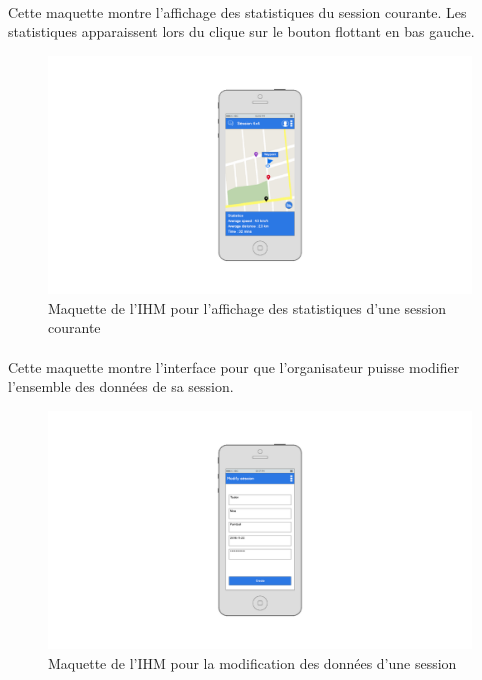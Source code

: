 \documentclass[titlepage, 12pt]{report}
\begin{document}
\clearpage

\paragraph{}Cette maquette montre l'affichage des statistiques du session courante. Les statistiques apparaissent lors du clique sur le bouton flottant en bas gauche.

\begin{figure}[!h]
	\caption{Maquette de l'IHM pour l'affichage des statistiques d'une session courante}
	\label{statistics_view}
	\centering
	\includegraphics[scale=0.3]{images/mockups/statistics.png}
\end{figure}

\clearpage

\paragraph{}Cette maquette montre l'interface pour que l'organisateur puisse modifier l'ensemble des données de sa session.

\begin{figure}[!h]
	\caption{Maquette de l'IHM pour la modification des données d'une session}
	\label{modify_session}
	\centering
	\includegraphics[scale=0.3]{images/mockups/modify_session.png}
\end{figure}
\end{document}
